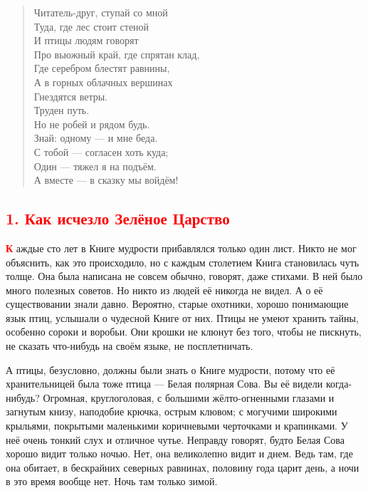 \documentclass[oneside,final,14pt]{extreport}
\begin{document}
	\thispagestyle{empty} %
	
	\newpage
	
	\begin{flushleft}
		\begin{verse}
			\qquad \qquad Читатель-друг, ступай со мной\\
			\qquad \qquad Туда, где лес стоит стеной\\
			\qquad \qquad И птицы людям говорят\\
			\qquad \qquad Про вьюжный край, где спрятан клад,\\
			\qquad \qquad Где серебром блестят равнины,\\
			\qquad \qquad А в горных облачных вершинах\\
			\qquad \qquad Гнездятся ветры.\\
			\qquad \qquad\qquad\qquad\qquad\qquad Труден путь.\\
			\qquad \qquad Но не робей и рядом будь.\\
			\qquad \qquad Знай: одному — и мне беда.\\
			\qquad \qquad С тобой — согласен хоть куда;\\
			\qquad \qquad Один — тяжел я на подъём.\\
			\qquad \qquad А вместе — в сказку мы войдём!\\
		\end{verse}
	\end{flushleft}
	
	{%
		\centering
		\subsection*{\textcolor{red}{1. Как исчезло Зелёное Царство}}
	}
	
	\lettrine[findent=0pt]{\textbf{\textcolor{red}{К}}}{} аждые сто лет в Книге мудрости прибавлялся только один лист. Никто не мог объяснить, как это происходило, но с каждым столетием Книга становилась чуть толще. Она была написана не совсем обычно, говорят, даже стихами. В ней было много полезных советов. Но никто из людей её никогда не видел. А о её существовании знали давно. Вероятно, старые охотники, хорошо понимающие язык птиц, услышали о чудесной Книге от них. Птицы не умеют хранить тайны, особенно сороки и воробьи. Они крошки не клюнут без того, чтобы не пискнуть, не сказать что-нибудь на своём языке, не посплетничать.
	
	А птицы, безусловно, должны были знать о Книге мудрости, потому что её хранительницей была тоже птица — Белая полярная Сова. Вы её видели когда-нибудь? Огромная, круглоголовая, с большими жёлто-огненными глазами и загнутым книзу, наподобие крючка, острым клювом; с могучими широкими крыльями, покрытыми маленькими коричневыми черточками и крапинками. У неё очень тонкий слух и отличное чутье. Неправду говорят, будто Белая Сова хорошо видит только ночью. Нет, она великолепно видит и днем. Ведь там, где она обитает, в бескрайних северных равнинах, половину года царит день, а ночи в это время вообще нет. Ночь там только зимой.
	
\end{document}
